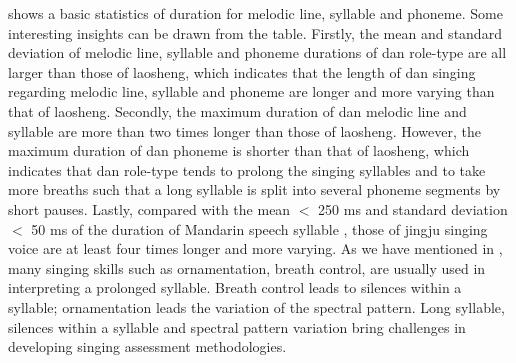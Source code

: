  shows a basic statistics of duration for melodic line, syllable and phoneme. Some interesting insights can be drawn from the table. Firstly, the mean and standard deviation of melodic line, syllable and phoneme durations of \gls{dan} role-type are all larger than those of \gls{laosheng}, which indicates that the length of \gls{dan} singing regarding melodic line, syllable and phoneme are longer and more varying than that of \gls{laosheng}. Secondly, the maximum duration of \gls{dan} melodic line and syllable are more than two times longer than those of \gls{laosheng}. However, the maximum duration of \gls{dan} phoneme is shorter than that of \gls{laosheng}, which indicates that \gls{dan} role-type tends to prolong the singing syllables and to take more breaths such that a long syllable is split into several phoneme segments by short pauses. Lastly, compared with the mean $<$ 250 ms and standard deviation $<$ 50 ms of the duration of Mandarin speech syllable \cite{wang_syllable_1994}, those of jingju singing voice are at least four times longer and more varying. As we have mentioned in , many singing skills such as ornamentation, breath control, are usually used in interpreting a prolonged syllable. Breath control leads to silences within a syllable; ornamentation leads the variation of the spectral pattern. Long syllable, silences within a syllable and spectral pattern variation bring challenges in developing singing assessment methodologies.

